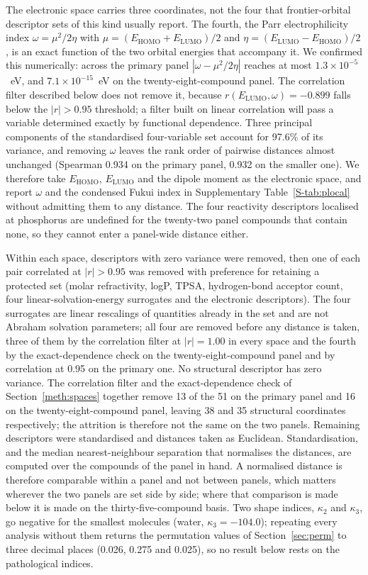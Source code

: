 \documentclass[1p,times]{elsarticle}
\begin{document}
The electronic space carries three coordinates, not the four that frontier-orbital
descriptor sets of this kind usually report. The fourth, the Parr electrophilicity
index $\omega = \mu^{2}/2\eta$ with $\mu = (E_{\mathrm{HOMO}} +
E_{\mathrm{LUMO}})/2$ and $\eta = (E_{\mathrm{LUMO}} - E_{\mathrm{HOMO}})/2$
\cite{parr1999}, is an exact function of the two orbital energies that accompany
it. We confirmed this numerically: across the primary panel
$|\omega - \mu^{2}/2\eta|$ reaches at most
$1.3\times10^{-5}$~eV, and $7.1\times10^{-15}$~eV on the
twenty-eight-compound panel. The correlation filter
described below does not remove it, because $r(E_{\mathrm{LUMO}}, \omega) =
-0.899$ falls below the $|r|>0.95$ threshold; a filter built on linear
correlation will pass a variable determined exactly by functional
dependence. Three principal components of
the standardised four-variable set account for 97.6\% of its variance, and
removing $\omega$ leaves the rank order of pairwise distances almost unchanged
(Spearman 0.934 on the primary panel, 0.932 on the smaller one). We therefore take $E_{\mathrm{HOMO}}$, $E_{\mathrm{LUMO}}$ and
the dipole moment as the electronic space, and report $\omega$ and the condensed
Fukui index in Supplementary Table~\ref{S-tab:plocal} without admitting them to
any distance. The four reactivity descriptors localised at phosphorus
are undefined for the twenty-two panel compounds that contain none, so they
cannot enter a panel-wide distance either.

Within each space, descriptors with zero variance were removed, then one of each
pair correlated at $|r|>0.95$ was removed with preference for retaining a
protected set (molar refractivity, logP, TPSA, hydrogen-bond acceptor count, four
linear-solvation-energy surrogates and the electronic descriptors). The
four surrogates are linear rescalings of quantities already in the set and are
not Abraham solvation parameters; all four are removed before any
distance is taken, three of them by the correlation filter at $|r| = 1.00$ in
every space and the fourth by the exact-dependence check on the
twenty-eight-compound panel and by correlation at 0.95 on the primary one. No structural descriptor has zero
variance. The correlation filter and the exact-dependence check of
Section~\ref{meth:spaces} together remove 13 of the 51 on the primary panel and
16 on the twenty-eight-compound panel, leaving 38 and 35 structural coordinates
respectively; the attrition is therefore not the same on the two panels. Remaining descriptors were
standardised and distances taken as Euclidean. Standardisation, and the median
nearest-neighbour separation that normalises the distances, are computed over
the compounds of the panel in hand. A normalised distance is therefore
comparable within a panel and not between panels, which matters wherever the
two panels are set side by side; where that comparison is made below it is made
on the thirty-five-compound basis. Two shape indices, $\kappa_2$ and
$\kappa_3$, go negative for the smallest molecules (water,
$\kappa_3=-104.0$); repeating every analysis without them returns the
permutation values of Section~\ref{sec:perm} to three decimal places (0.026,
0.275 and 0.025), so no result below rests on the pathological indices.
\end{document}
